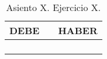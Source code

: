 \begin{table}[H]
    \centering
    \begin{tabular}{|p{3cm}|p{6cm}|p{3cm}|}
    \hline
    \rowcolor{blue!30}
    \textbf{DEBE} & \textbf{} & \textbf{HABER} \\
    \hline
    &  & \\
    \hline
    &  & \\
    \hline
    &  & \\
    \hline
    &  & \\
    \hline
    \end{tabular}
    \caption{Asiento X. Ejercicio X.}
    \label{tabla:asientoXejX}
\end{table}
